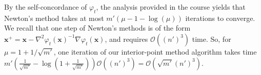 \documentclass{article}
\begin{document}
\begin{itemize}
           By the self-concordance of $\varphi_{t}$, 
           the analysis provided in the course
           yields that Newton's method
           takes at most $m'\left(\mu-1-\log\left(\mu\right)\right)$ 
           iterations to converge.
           We recall that one step of Newton's methods
           is of the form $\mathbf{x}^{+} = 
           \mathbf{x} - \nabla^{2}\varphi_{t}\left(\mathbf{x}\right)^{-1}
           \nabla \varphi_{t}\left(\mathbf{x}\right)$,
           and requires $\mathcal{O} \left(\left(n'\right)^{3}\right)$
           time.
           So, for $\mu = 1 + 1/\sqrt{m'}$, one iteration of our interior-point method
           algorithm takes time
           $m'\left(\frac{1}{\sqrt{m'}} - \log\left(1 + \frac{1}{\sqrt{m'}}\right)\right)
           \mathcal{O} \left(\left(n'\right)^{3}\right) =
           \mathcal{O} \left(\sqrt{m'} \left(n'\right)^{3}\right)$.
   \end{itemize}
 
\end{document}
